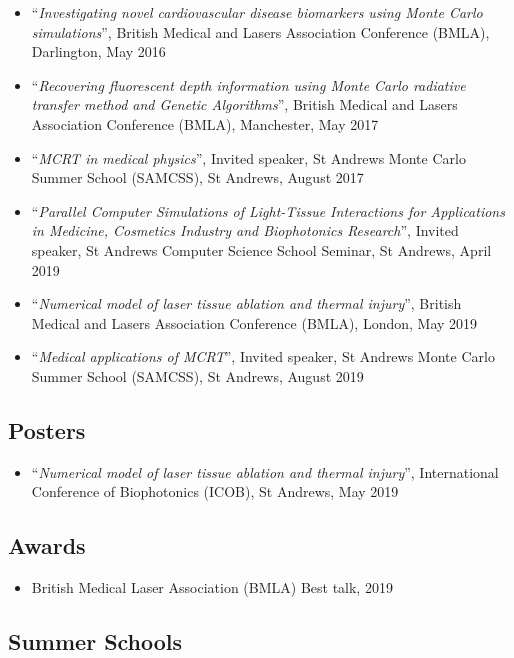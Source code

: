 \documentclass[10pt,a4paper,twoside]{book}
\begin{document}
\begin{itemize}
\item ``\textit{Investigating novel cardiovascular disease biomarkers using Monte Carlo simulations}'', British Medical and Lasers Association Conference (BMLA), Darlington, May 2016
\item ``\textit{Recovering fluorescent depth information using Monte Carlo radiative transfer method and Genetic Algorithms}'', British Medical and Lasers Association Conference (BMLA), Manchester, May 2017
\item ``\textit{MCRT in medical physics}'', Invited speaker, St Andrews Monte Carlo Summer School (SAMCSS), St Andrews, August 2017
\item ``\textit{Parallel Computer Simulations of Light-Tissue Interactions for Applications in Medicine, Cosmetics Industry and Biophotonics Research}'', Invited speaker, St Andrews Computer Science School Seminar, St Andrews, April 2019
\item ``\textit{Numerical model of laser tissue ablation and thermal injury}'', British Medical and Lasers Association Conference (BMLA), London, May 2019
\item ``\textit{Medical applications of MCRT}'', Invited speaker, St Andrews Monte Carlo Summer School (SAMCSS), St Andrews, August 2019
\end{itemize}


\subsection*{Posters}

\begin{itemize}
\item ``\textit{Numerical model of laser tissue ablation and thermal injury}'', International Conference of Biophotonics (ICOB), St Andrews, May 2019
\end{itemize}


\subsection*{Awards}

\begin{itemize}
\item British Medical Laser Association (BMLA) Best talk, 2019
\end{itemize}

\subsection*{Summer Schools}
\end{document}
